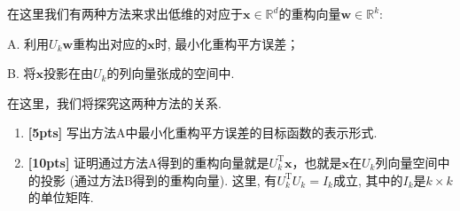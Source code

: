 \documentclass[a4paper,UTF8]{article}
\numberwithin{equation}{section}
\begin{document}
在这里我们有两种方法来求出低维的对应于$\mathbf{x}\in \mathbb{R}^d$的重构向量$\mathbf{w}\in \mathbb{R}^k$:

A. 利用$U_k\mathbf{w}$重构出对应的$\mathbf{x}$时, 最小化重构平方误差；

B. 将$\mathbf{x}$投影在由$U_k$的列向量张成的空间中.

在这里，我们将探究这两种方法的关系.
\begin{enumerate}[(1)]
	\item \textbf{[5pts]} 写出方法A中最小化重构平方误差的目标函数的表示形式.
	\item \textbf{[10pts]} 证明通过方法A得到的重构向量就是$U_k^\mathrm{T}\mathbf{x}$，也就是$\mathbf{x}$在$U_k$列向量空间中的投影 (通过方法B得到的重构向量). 这里, 有$U_k^\mathrm{T}U_k=I_k$成立, 其中的$I_k$是$k\times k$的单位矩阵.
\end{enumerate}
\end{document}
